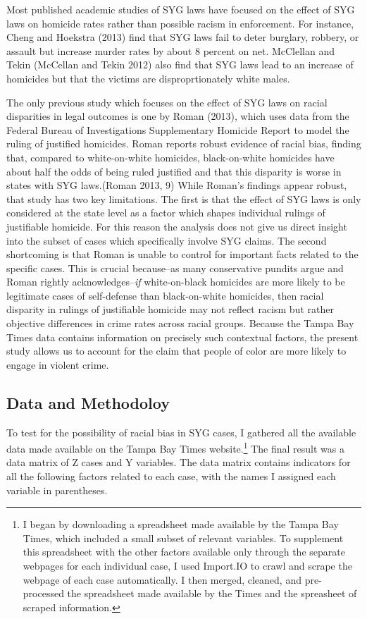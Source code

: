 \documentclass[12pt,article]{article}
\begin{document}
Most published academic studies of SYG laws have focused on the effect
of SYG laws on homicide rates rather than possible racism in
enforcement. For instance, Cheng and Hoekstra (2013) find that SYG laws
fail to deter burglary, robbery, or assault but increase murder rates by
about 8 percent on net. McClellan and Tekin (McCellan and Tekin 2012)
also find that SYG laws lead to an increase of homicides but that the
victims are disproprtionately white males.

The only previous study which focuses on the effect of SYG laws on
racial disparities in legal outcomes is one by Roman (2013), which uses
data from the Federal Bureau of Investigations Supplementary Homicide
Report to model the ruling of justified homicides. Roman reports robust
evidence of racial bias, finding that, compared to white-on-white
homicides, black-on-white homicides have about half the odds of being
ruled justified and that this disparity is worse in states with SYG
laws.(Roman 2013, 9) While Roman's findings appear robust, that study
has two key limitations. The first is that the effect of SYG laws is
only considered at the state level as a factor which shapes individual
rulings of justifiable homicide. For this reason the analysis does not
give us direct insight into the subset of cases which specifically
involve SYG claims. The second shortcoming is that Roman is unable to
control for important facts related to the specific cases. This is
crucial because--as many conservative pundits argue and Roman rightly
acknowledges--\emph{if} white-on-black homicides are more likely to be
legitimate cases of self-defense than black-on-white homicides, then
racial disparity in rulings of justifiable homicide may not reflect
racism but rather objective differences in crime rates across racial
groups. Because the Tampa Bay Times data contains information on
precisely such contextual factors, the present study allows us to
account for the claim that people of color are more likely to engage in
violent crime.

\subsection{Data and Methodoloy}\label{data-and-methodoloy}

To test for the possibility of racial bias in SYG cases, I gathered all
the available data made available on the Tampa Bay Times
website.\footnote{I began by downloading a spreadsheet made available by
  the Tampa Bay Times, which included a small subset of relevant
  variables. To supplement this spreadsheet with the other factors
  available only through the separate webpages for each individual case,
  I used Import.IO to crawl and scrape the webpage of each case
  automatically. I then merged, cleaned, and pre-processed the
  spreadsheet made available by the Times and the spreasheet of scraped
  information.} The final result was a data matrix of Z cases and Y
variables. The data matrix contains indicators for all the following
factors related to each case, with the names I assigned each variable in
parentheses.
\end{document}
